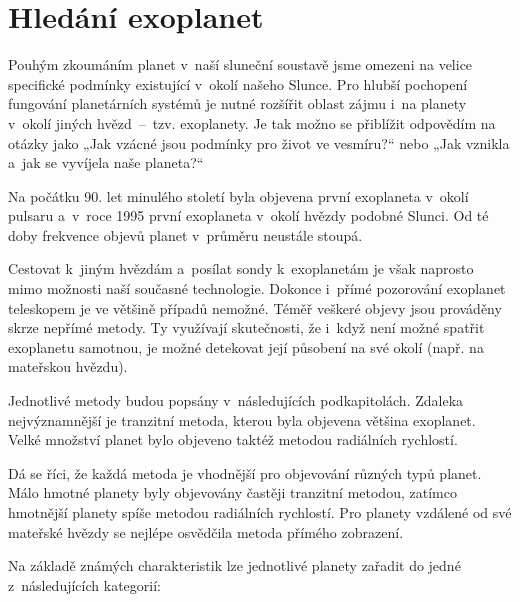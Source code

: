 \documentclass[a4paper,12pt]{article}
\begin{document}
\section{Hledání exoplanet}

Pouhým zkoumáním planet v~naší sluneční soustavě jsme omezeni na velice specifické podmínky existující v~okolí našeho Slunce. Pro hlubší pochopení fungování planetárních systémů je nutné rozšířit oblast zájmu i~na planety v~okolí jiných hvězd~--~tzv. exoplanety. Je tak možno se přiblížit odpovědím na otázky jako „Jak vzácné jsou podmínky pro život ve vesmíru?“ nebo „Jak vznikla a~jak se vyvíjela naše planeta?“~\cite{exoplanets}

Na počátku 90. let minulého století byla objevena první exoplaneta v~okolí pulsaru a~v~roce 1995 první exoplaneta v~okolí hvězdy podobné Slunci. Od té doby frekvence objevů planet v~průměru neustále stoupá.~\cite{exoplanets,nasadata}


Cestovat k~jiným hvězdám a~posílat sondy k~exoplanetám je však naprosto mimo možnosti naší současné technologie. Dokonce i~přímé pozorování exoplanet teleskopem je ve většině případů nemožné. Téměř veškeré objevy jsou prováděny skrze nepřímé metody. Ty využívají skutečnosti, že i~když není možné spatřit exoplanetu samotnou, je možné detekovat její působení na své okolí (např. na mateřskou hvězdu).

Jednotlivé metody budou popsány v~následujících podkapitolách. Zdaleka nejvýznamnější je tranzitní metoda, kterou byla objevena většina exoplanet. Velké množství planet bylo objeveno taktéž metodou radiálních rychlostí.~\cite{nasadata}


Dá se říci, že každá metoda je vhodnější pro objevování různých typů planet. Málo hmotné planety byly objevovány častěji tranzitní metodou, zatímco hmotnější planety spíše metodou radiálních rychlostí. Pro planety vzdálené od své mateřské hvězdy se nejlépe osvědčila metoda přímého zobrazení.~\cite{nasadata}


\newpage

Na základě známých charakteristik lze jednotlivé planety zařadit do jedné z~následujících kategorií:
\end{document}
